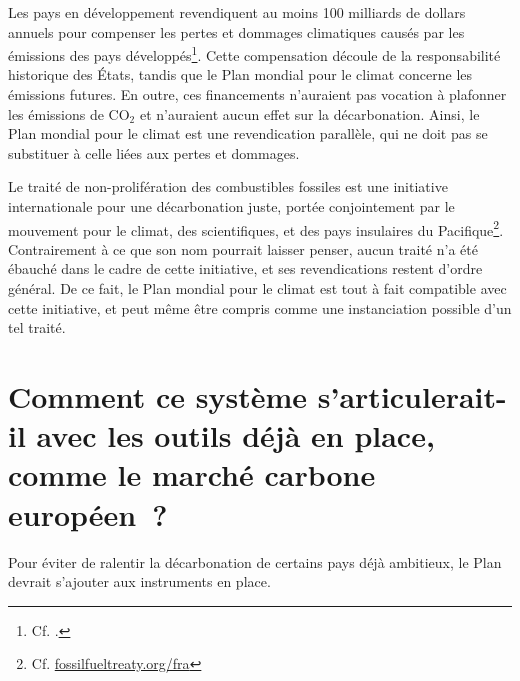 \documentclass[a5paper,french,openany]{memoir}
\begin{document}
Les pays en développement revendiquent au moins 100 milliards de dollars annuels pour compenser les pertes et dommages climatiques causés par les émissions des pays développés\footnote{Cf. \cite{tc_proposal_2023}.}. Cette compensation découle de la responsabilité historique des États, tandis que le Plan mondial pour le climat concerne les émissions futures. En outre, ces financements n'auraient pas vocation à plafonner les émissions de CO$_\text{2}$ et n'auraient aucun effet sur la décarbonation. %
Ainsi, le Plan mondial pour le climat est une revendication parallèle, qui ne doit pas se substituer à celle liées aux pertes et dommages.

Le traité de non-prolifération des combustibles fossiles est une initiative internationale pour une décarbonation juste, portée conjointement par le mouvement pour le climat, des scientifiques, et des pays insulaires du Pacifique\footnote{Cf. \href{https://fossilfueltreaty.org/fra}{fossilfueltreaty.org/fra}}. Contrairement à ce que son nom pourrait laisser penser, aucun traité n'a été ébauché dans le cadre de cette initiative, et ses revendications restent d'ordre général. De ce fait, le Plan mondial pour le climat est tout à fait compatible avec cette initiative, et peut même être compris comme une instanciation possible d'un tel traité.

\section*{\normalsize Comment ce système s'articulerait-il avec les outils déjà en place, comme le marché carbone européen~?}\label{q:ets}

Pour éviter de ralentir la décarbonation de certains pays déjà ambitieux, le Plan devrait s'ajouter aux instruments en place. 
\end{document}
